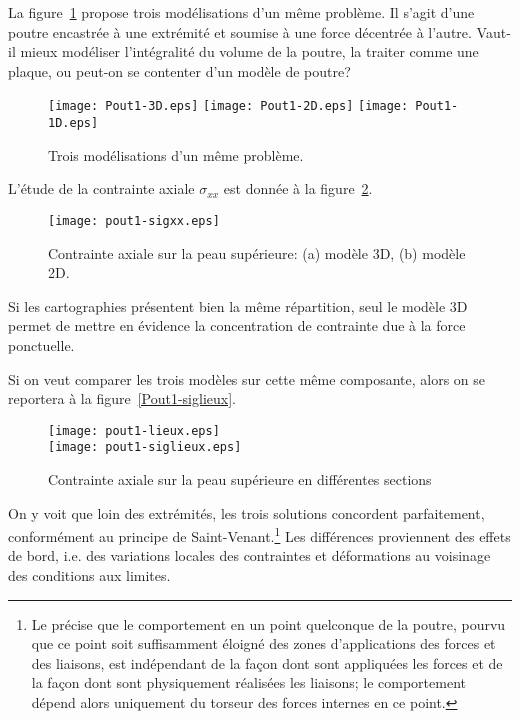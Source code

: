 \bigskip
La figure~\ref{Pout1} propose trois modélisations d'un même problème.
Il s'agit d'une poutre encastrée à une extrémité et soumise à une force
décentrée à l'autre.
Vaut-il mieux modéliser l'intégralité du volume de la poutre, la traiter comme
une plaque, ou peut-on se contenter d'un modèle de poutre?
\begin{figure}[ht]
\centering
\texttt{[image: Pout1-3D.eps]} \hfill
\texttt{[image: Pout1-2D.eps]} \hfill
\texttt{[image: Pout1-1D.eps]}

\caption{\label{Pout1} Trois modélisations d'un même problème.}
\end{figure}

\medskip
L'étude de la contrainte axiale $\sigma_{xx}$ est donnée à la figure~\ref{Pout1-sigxx}.
\begin{figure}[ht]
\centering
\texttt{[image: pout1-sigxx.eps]}
\caption{\label{Pout1-sigxx} Contrainte axiale sur la peau supérieure: (a) modèle 3D,
(b) modèle 2D.}
\end{figure}
Si les cartographies présentent bien la même répartition, seul le modèle 3D
permet de mettre en évidence la concentration de contrainte due à la force ponctuelle.

\medskip
Si on veut comparer les trois modèles sur cette même composante, alors
on se reportera à la figure~\ref{Pout1-siglieux}.
\begin{figure}[ht]
\centering
\texttt{[image: pout1-lieux.eps]}\\
\texttt{[image: pout1-siglieux.eps]}
\caption{Contrainte axiale sur la peau supérieure en différentes sections}
\end{figure}\label{Pout1-siglieux}
On y voit que loin des extrémités, les trois solutions concordent parfaitement, conformément
au principe de Saint-Venant.\footnote{Le  précise que le comportement
en un point quelconque de la poutre, pourvu que ce point soit suffisamment éloigné des zones
d'applications des forces et des liaisons, est indépendant de la façon dont sont appliquées
les forces et de la façon dont sont physiquement réalisées les liaisons; le comportement
dépend alors uniquement du torseur des forces internes en ce point.}
Les différences proviennent des effets de bord, i.e. des variations
locales des contraintes et déformations au voisinage des conditions aux limites.

